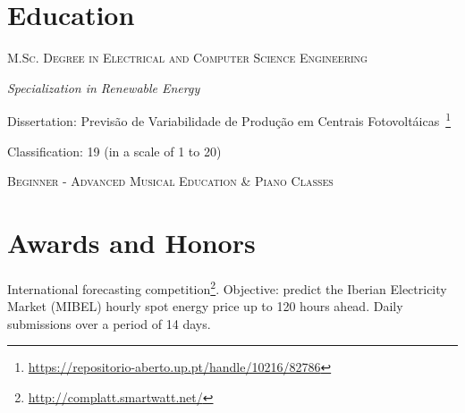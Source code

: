 \documentclass{mycv}
\begin{document}

\vspace{0.5cm}

\section{Education}{

\textsc{M.Sc. Degree in Electrical and Computer Science Engineering}

\textit{Specialization in Renewable Energy}

\begin{myitemize}
	\item Dissertation: Previs\~{a}o de Variabilidade de Produ\c{c}\~{a}o em Centrais Fotovolt\'{a}icas~\footnote{\url{https://repositorio-aberto.up.pt/handle/10216/82786}}
	\begin{myitemize}
		\item Classification: 19 (in a scale of 1 to 20)
	\end{myitemize}
\end{myitemize}


\vspace{0.05cm}

\textsc{Beginner - Advanced Musical Education \& Piano Classes}
\vspace{0.5cm}

\vspace{4cm}

\pagebreak

\section{Awards and Honors}



International forecasting competition\footnote{\url{http://complatt.smartwatt.net/}}. Objective: predict the Iberian Electricity Market (MIBEL) hourly spot energy price up to 120 hours ahead. Daily submissions over a period of 14 days.


}
\end{document}
